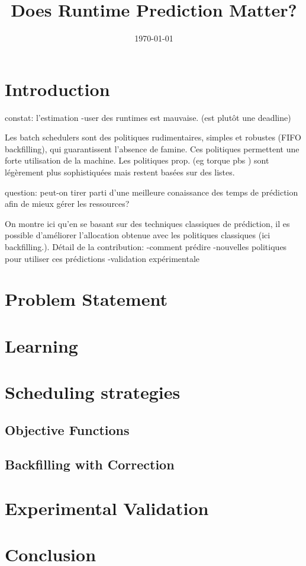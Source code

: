 \documentclass[a4paper,10pt]{article}
\title{Does Runtime Prediction Matter?}
\author{}
\date{\today}
\begin{document}
\maketitle

\section{Introduction}
\label{sec:introduction}
constat: l'estimation -user des runtimes est mauvaise. (est plutôt une deadline)

Les batch schedulers sont des politiques rudimentaires, simples et robustes (FIFO backfilling), qui guarantissent l'absence de famine. Ces politiques permettent une forte utilisation de la machine.
Les politiques prop. (eg torque pbs ) sont légèrement plus sophistiquées mais restent basées sur des listes.

question: peut-on tirer parti d'une meilleure conaissance des temps de prédiction afin de mieux gérer les ressources?

On montre ici qu'en se basant sur des techniques classiques de prédiction, il es possible d'améliorer  l'allocation obtenue avec les politiques classiques (ici backfilling.).
Détail de la contribution:
-comment prédire
-nouvelles politiques pour  utiliser ces prédictions
-validation expérimentale

\section{Problem Statement}
\label{sec:problem_statement}

\section{Learning}
\label{sec:learning}

\section{Scheduling strategies}
\label{sec:scheduling_strategies}

\subsection{Objective Functions}
\label{sub:objective_functions}

\subsection{Backfilling with Correction}
\label{sub:backfilling_with_correction}


\section{Experimental Validation}
\label{sec:experimental_validation}

\section{Conclusion}
\label{sec:conclusion}
\end{document}
